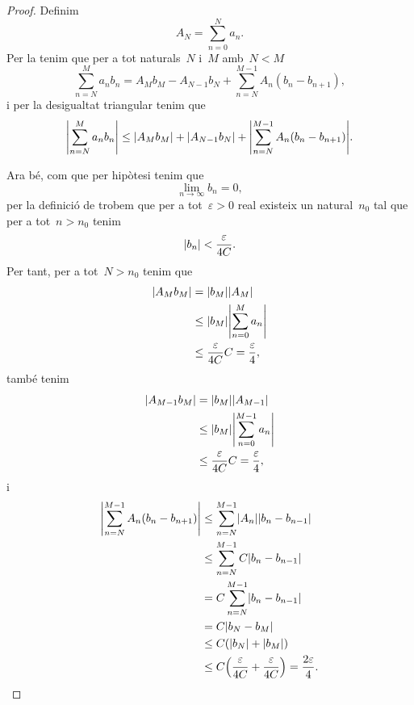 \documentclass[../../main.tex]{subfiles}
\begin{document}
    \begin{proof}
        Definim
        \[
            A_{N}=\sum_{n=0}^{N}a_{n}.
        \]
        Per la  tenim que per a tot naturals~\(N\) i~\(M\) amb~\(N<M\)
        \[
            \sum_{n=N}^{M}a_{n}b_{n}=A_{M}b_{M}-A_{N-1}b_{N}+\sum_{n=N}^{M-1}A_{n}(b_{n}-b_{n+1}),
        \]
        i per la desigualtat triangular %
        tenim que
        \begin{equation}
            \label{thm:Teorema de Dirichlet per sèries numèriques:eq1}
            \abs{\sum_{n=N}^{M}a_{n}b_{n}}\leq\abs{A_{M}b_{M}}+\abs{A_{N-1}b_{N}}+\abs{\sum_{n=N}^{M-1}A_{n}(b_{n}-b_{n+1})}.
        \end{equation}

        Ara bé, com que per hipòtesi tenim que
        \[
            \lim_{n\to\infty}b_{n}=0,
        \]
        per la definició de  trobem que per a tot~\(\varepsilon>0\) real existeix un natural~\(n_{0}\) tal que per a tot~\(n>n_{0}\) tenim
        \[
            \abs{b_{n}}<\frac{\varepsilon}{4C}.
        \]
        Per tant, per a tot~\(N>n_{0}\) tenim que
        \begin{align*}
            \abs{A_{M}b_{M}}&=\abs{b_{M}}\abs{A_{M}} \\
            &\leq\abs{b_{M}}\abs{\sum_{n=0}^{M}a_{n}} \\ %
            &\leq\frac{\varepsilon}{4C}C=\frac{\varepsilon}{4},
        \end{align*}
        també tenim
        \begin{align*}
            \abs{A_{M-1}b_{M}}&=\abs{b_{M}}\abs{A_{M-1}} \\
            &\leq\abs{b_{M}}\abs{\sum_{n=0}^{M-1}a_{n}} \\ %
            &\leq\frac{\varepsilon}{4C}C=\frac{\varepsilon}{4},
        \end{align*}
        i
        \begin{align*}
            \abs{\sum_{n=N}^{M-1}A_{n}(b_{n}-b_{n+1})}&\leq\sum_{n=N}^{M-1}\abs{A_{n}}\abs{b_{n}-b_{n-1}} \\
            &\leq\sum_{n=N}^{M-1}C\abs{b_{n}-b_{n-1}} \\
            &=C\sum_{n=N}^{M-1}\abs{b_{n}-b_{n-1}} \\
            &=C\abs{b_{N}-b_{M}} \\
            &\leq C(\abs{b_{N}}+\abs{b_{M}}) \\
            &\leq C\left(\frac{\varepsilon}{4C}+\frac{\varepsilon}{4C}\right)=\frac{2\varepsilon}{4}.

\end{align*}
\end{proof}
\end{document}
